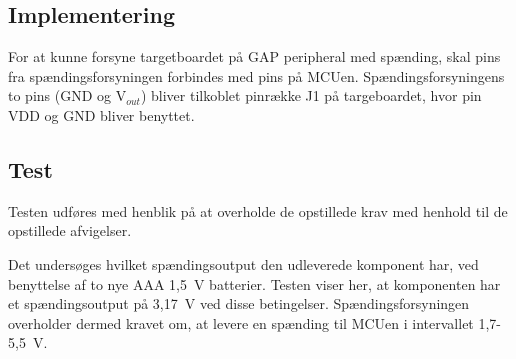 \subsection{Implementering}
For at kunne forsyne targetboardet på GAP peripheral med spænding, skal pins fra spændingsforsyningen forbindes med pins på MCUen. 
Spændingsforsyningens to pins (GND og V$_{out}$) bliver tilkoblet pinrække J1 på targeboardet, hvor pin VDD og GND bliver benyttet.

\subsection{Test} 
Testen udføres med henblik på at overholde de opstillede krav med henhold til de opstillede afvigelser. 

Det undersøges hvilket spændingsoutput den udleverede komponent har, ved benyttelse af to nye AAA 1,5~V batterier. Testen viser her, at komponenten har et spændingsoutput på 3,17~V ved disse betingelser.\newline
Spændingsforsyningen overholder dermed kravet om, at levere en spænding til MCUen i intervallet 1,7-5,5~V. 




